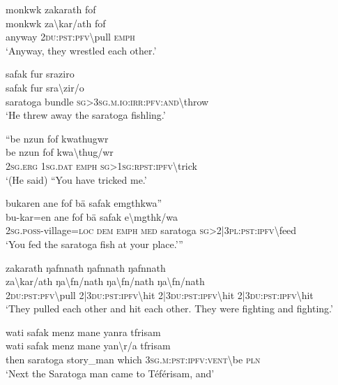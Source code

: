 \ea\label{ex:3:a7577}
monkwk zakarath fof\\
\gll monkwk	za{\textbackslash}kar/ath	fof\\
     anyway	2\textsc{du}:\textsc{pst}:\textsc{pfv}{\textbackslash}pull	\textsc{emph}\\
\glt `Anyway, they wrestled each other.'
\z

\ea\label{ex:3:a7579}
safak fur sraziro\\
\gll safak	fur	sra{\textbackslash}zir/o\\
     saratoga	bundle	\textsc{sg}>3\textsc{sg}.\textsc{m}.\textsc{io}:\textsc{irr}:\textsc{pfv}:\textsc{and}{\textbackslash}throw\\
\glt `He threw away the saratoga fishling.'
\z

\ea\label{ex:3:a7580}
``be nzun fof kwathugwr\\
\gll be	nzun	fof	kwa{\textbackslash}thug/wr\\
     2\textsc{sg}.\textsc{erg}	1\textsc{sg}.\textsc{dat}	\textsc{emph}	\textsc{sg}>1\textsc{sg}:\textsc{rpst}:\textsc{ipfv}{\textbackslash}trick\\
\glt `(He said) ``You have tricked me.'
\z

\ea\label{ex:3:a7581}
bukaren ane fof bä safak emgthkwa''\\
\gll bu-kar=en	ane	fof	bä	safak	e{\textbackslash}mgthk/wa\\
     2\textsc{sg}.\textsc{poss}-village=\textsc{loc}	\textsc{dem}	\textsc{emph}	\textsc{med}	saratoga	\textsc{sg}>2|3\textsc{pl}:\textsc{pst}:\textsc{ipfv}{\textbackslash}feed\\
\glt `You fed the saratoga fish at your place.'''
\z

\ea\label{ex:3:a7582}
zakarath ŋafnnath ŋafnnath ŋafnnath\\
\gll za{\textbackslash}kar/ath	ŋa{\textbackslash}fn/nath	ŋa{\textbackslash}fn/nath	ŋa{\textbackslash}fn/nath\\
     2\textsc{du}:\textsc{pst}:\textsc{pfv}{\textbackslash}pull	2|3\textsc{du}:\textsc{pst}:\textsc{ipfv}{\textbackslash}hit	2|3\textsc{du}:\textsc{pst}:\textsc{ipfv}{\textbackslash}hit	2|3\textsc{du}:\textsc{pst}:\textsc{ipfv}{\textbackslash}hit\\
\glt `They pulled each other and hit each other. They were fighting and fighting.'
\z

\ea\label{ex:3:a7584}
wati safak menz mane yanra tfrisam\\
\gll wati	safak	menz	mane	yan{\textbackslash}r/a	tfrisam\\
     then	saratoga	story\_man	which	3\textsc{sg}.\textsc{m}:\textsc{pst}:\textsc{ipfv}:\textsc{vent}{\textbackslash}be	\textsc{pln}\\
\glt `Next the Saratoga man came to Téférisam, and'
\z

